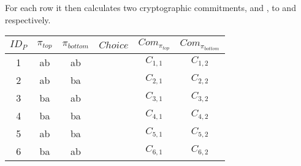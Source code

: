 For each row it then calculates two cryptographic commitments, \ctop{} and
\cbottom{}, to \ptop{} and \pbottom{} respectively.

\begin{table}
\centering
\begin{tabular}{|c|c|c|c|c|c|}
\hline
$ID_P$ & $\pi_{top}$ & $\pi_{bottom}$ & $Choice$ & $Com_{\pi_{top}}$ & $Com_{\pi_{bottom}}$ \\
		\hline
		1 & ab & ab & & $C_{1, 1}$ & $C_{1, 2}$ \\
			2 & ab & ba & & $C_{2, 1}$ & $C_{2, 2}$ \\
			3 & ba & ab & & $C_{3, 1}$ & $C_{3, 2}$ \\
			4 & ba & ba & & $C_{4, 1}$ & $C_{4, 2}$ \\
			5 & ab & ba & & $C_{5, 1}$ & $C_{5, 2}$ \\
			6 & ba & ab & & $C_{6, 1}$ & $C_{6, 2}$ \\
			\hline
			\end{tabular}
			\end{table}
